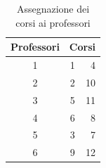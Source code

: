 \documentclass[a4paper,oneside,12pt]{book}
\begin{document}
    \FloatBarrier
    \begin{table}[h]
        \centering
        \begin{tabular}{|c | r r|}
            \hline
            Professori &\multicolumn{2}{c|}{Corsi}\\ %
            \hline
            1 &1&4\\
            2 &2&10\\
            3 &5&11\\
            4 &6&8\\
            5 &3&7\\
            6 &9&12\\
            \hline
        \end{tabular}
        \caption{Assegnazione dei corsi ai professori}
    \end{table}
\end{document}
